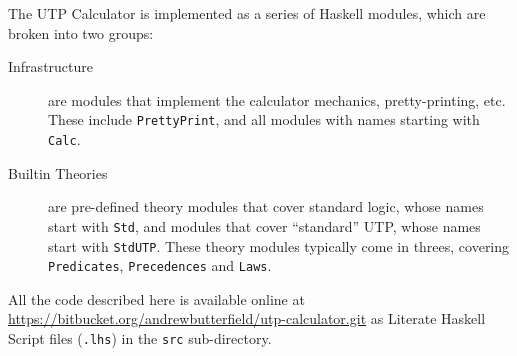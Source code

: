 The UTP Calculator is implemented as a series
of Haskell modules,
which are broken into two groups:
\begin{description}
  \item[Infrastructure]
    are modules that implement the calculator mechanics,
    pretty-printing, etc.
    These include \texttt{PrettyPrint},
    and all modules with names starting with \texttt{Calc}.
  \item[Builtin Theories]
    are pre-defined theory modules that cover standard logic,
    whose names start with \texttt{Std}, and modules that cover ``standard''
    UTP, whose names start with \texttt{StdUTP}.
    These theory modules typically come in threes, covering
    \texttt{Predicates}, \texttt{Precedences} and \texttt{Laws}.
\end{description}
All the code described here is available online
at
\\\url{https://bitbucket.org/andrewbutterfield/utp-calculator.git}
as Literate Haskell Script files (\texttt{.lhs})
in the \texttt{src} sub-directory.
